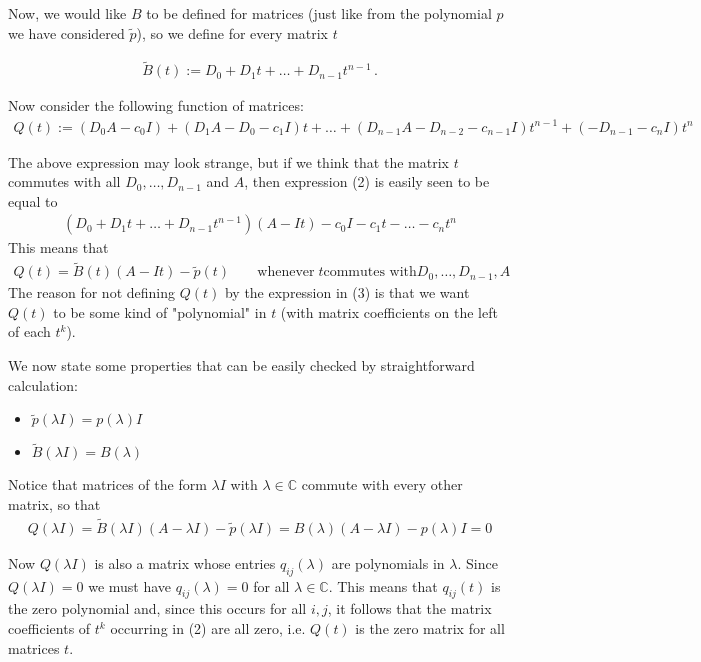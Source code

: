 \documentclass[12pt]{article}
\begin{document}
Now, we would like $B$ to be defined for matrices (just like from the polynomial $p$ we have considered $\widetilde{p}$), so we define for every matrix $t$

\begin{align*}
\widetilde{B}(t):=D_0 + D_1 t + \dots + D_{n-1}t^{n-1}\,.
\end{align*}

Now consider the following function of matrices:
\begin{align}
Q(t):= (D_0A - c_0I)+ (D_1A-D_0-c_1I)t + \dots + (D_{n-1}A- D_{n-2} - c_{n-1}I)t^{n-1}+(-D_{n-1} - c_nI)t^n
\end{align}

The above expression may look strange, but if we think that the matrix $t$ commutes with all $D_0, \dots, D_{n-1}$ and $A$, then  expression (2) is easily seen to be equal to
\begin{align*}
(D_0+D_1t+ \dots +D_{n-1}t^{n-1})(A-It) - c_0I - c_1t - \dots - c_nt^n 
\end{align*}
This means that
\begin{align}
Q(t)=\widetilde{B}(t)(A-It) - \widetilde{p}(t) \;\;\;\;\;\;\; \text{whenever} \; t \text{commutes with} D_0, \dots, D_{n-1}, A
\end{align}
The reason for not defining $Q(t)$ by the expression in (3) is that we want $Q(t)$ to be some kind of "polynomial" in $t$ (with matrix coefficients on the left of each $t^k$). 

We now state some properties that can be easily checked by straightforward calculation:
\begin{itemize}
\item $\widetilde{p}(\lambda I) = p(\lambda)I$
\item $\widetilde{B}(\lambda I) = B(\lambda)$
\end{itemize}

Notice that matrices of the form $\lambda I$ with $\lambda \in \mathbb{C}$ commute with every other matrix, so that
\begin{align*}
Q(\lambda I) = \widetilde{B}(\lambda I)(A-\lambda I) - \widetilde{p}(\lambda I)= B(\lambda)(A-\lambda I) - p(\lambda)I = 0
\end{align*}

Now $Q(\lambda I)$ is also a matrix whose entries $q_{ij}(\lambda)$ are polynomials in $\lambda$. Since $Q(\lambda I) =0$ we must have $q_{ij}(\lambda) = 0$ for all $\lambda \in \mathbb{C}$. This means that $q_{ij}(t)$ is the zero
polynomial and, since this occurs for all $i, j$, it follows that
the matrix coefficients of $t^k$ occurring in (2) are all zero, i.e. $Q(t)$ is the zero matrix for all matrices $t$. 
\end{document}
